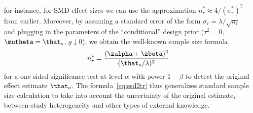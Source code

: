 for instance, for SMD effect sizes we can use the approximation
$n_{r}^{*} \approx 4/(\sigma^*_{r})^{2}$ from
earlier. %
Moreover, by assuming a standard error of the form
$\sigma_{r} = \lambda/\sqrt{n_{r}}$ and plugging in the parameters of the
``conditional'' design prior %
($\tau^{2} = 0$, $\mutheta = \that_{o}$, $g \downarrow 0$), we obtain the
well-known sample size formula \citep[ch. 3.3]{Matthews2006}
\begin{align*}
  n_{r}^{*} = \frac{(\zalpha + \zbeta)^{2}}{(\that_{o}/\lambda)^{2}}
\end{align*}
for a one-sided significance test at level $\alpha$ with power $1 - \beta$ to
detect the original effect estimate $\that_{o}$. The formula~\eqref{eq:ssd2tr}
thus generalizes standard sample size calculation to take into account the
uncertainty of the original estimate, between-study heterogeneity and other
types of external knowledge.


